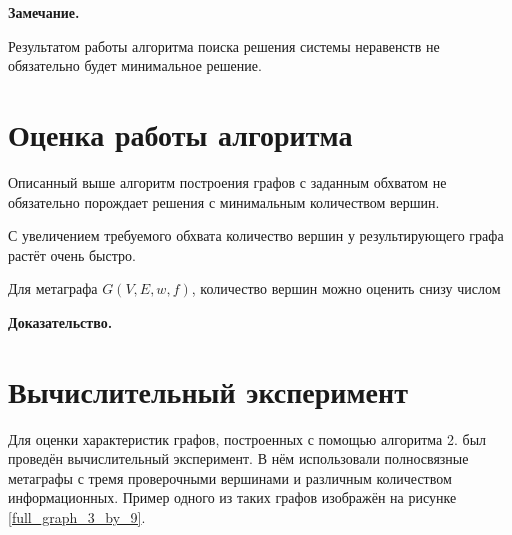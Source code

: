 \documentclass[14pt]{mmcs-article}
\begin{document}
\textbf{Замечание.}

Результатом работы алгоритма поиска решения системы неравенств не обязательно будет минимальное решение.


\section{Оценка работы алгоритма}

Описанный выше алгоритм построения графов с заданным обхватом не обязательно порождает решения с минимальным количеством вершин.


С увеличением требуемого обхвата количество вершин у результирующего графа растёт очень быстро.

Для метаграфа $G(V, E, w, f)$, количество вершин можно оценить снизу числом $  $ %

\textbf{Доказательство.}





\section{Вычислительный эксперимент}

Для оценки характеристик графов, построенных с помощью алгоритма 2. был проведён вычислительный эксперимент. В нём использовали полносвязные метаграфы с тремя проверочными вершинами и различным количеством информационных. Пример одного из таких графов изображён на рисунке \ref{full_graph_3_by_9}. 
\end{document}

